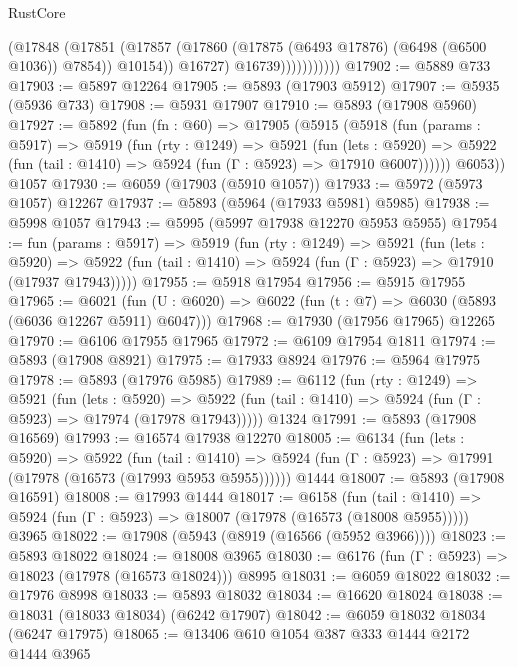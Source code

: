 \begin{lexlean}{RustCore}
\begin{coremodule}
                          (@17848
                            (@17851
                              (@17857
                                (@17860 (@17875 (@6493 @17876) (@6498 (@6500 @1036)) @7854))
                                @10154))
                            @16727)
                          @16739)))))))))))
@17902 := @5889 @733
@17903 := @5897 @12264
@17905 := @5893 (@17903 @5912)
@17907 := @5935 (@5936 @733)
@17908 := @5931 @17907
@17910 := @5893 (@17908 @5960)
@17927 := @5892
    (fun (fn : @60) =>
    @17905
      (@5915
        (@5918
          (fun (params : @5917) =>
          @5919
            (fun (rty : @1249) =>
            @5921
              (fun (lets : @5920) =>
              @5922 (fun (tail : @1410) => @5924 (fun (Γ : @5923) => @17910 @6007))))))
        @6053))
    @1057
@17930 := @6059 (@17903 (@5910 @1057))
@17933 := @5972 (@5973 @1057) @12267
@17937 := @5893 (@5964 (@17933 @5981) @5985)
@17938 := @5998 @1057
@17943 := @5995 (@5997 @17938 @12270 @5953 @5955)
@17954 := fun (params : @5917) =>
  @5919
    (fun (rty : @1249) =>
    @5921
      (fun (lets : @5920) =>
      @5922 (fun (tail : @1410) => @5924 (fun (Γ : @5923) => @17910 (@17937 @17943)))))
@17955 := @5918 @17954
@17956 := @5915 @17955
@17965 := @6021
    (fun (U : @6020) => @6022 (fun (t : @7) => @6030 (@5893 (@6036 @12267 @5911) @6047)))
@17968 := @17930 (@17956 @17965) @12265
@17970 := @6106 @17955 @17965
@17972 := @6109 @17954 @1811
@17974 := @5893 (@17908 @8921)
@17975 := @17933 @8924
@17976 := @5964 @17975
@17978 := @5893 (@17976 @5985)
@17989 := @6112
    (fun (rty : @1249) =>
    @5921
      (fun (lets : @5920) =>
      @5922 (fun (tail : @1410) => @5924 (fun (Γ : @5923) => @17974 (@17978 @17943)))))
    @1324
@17991 := @5893 (@17908 @16569)
@17993 := @16574 @17938 @12270
@18005 := @6134
    (fun (lets : @5920) =>
    @5922
      (fun (tail : @1410) =>
      @5924 (fun (Γ : @5923) => @17991 (@17978 (@16573 (@17993 @5953 @5955))))))
    @1444
@18007 := @5893 (@17908 @16591)
@18008 := @17993 @1444
@18017 := @6158
    (fun (tail : @1410) => @5924 (fun (Γ : @5923) => @18007 (@17978 (@16573 (@18008 @5955)))))
    @3965
@18022 := @17908 (@5943 (@8919 (@16566 (@5952 @3966))))
@18023 := @5893 @18022
@18024 := @18008 @3965
@18030 := @6176 (fun (Γ : @5923) => @18023 (@17978 (@16573 @18024))) @8995
@18031 := @6059 @18022
@18032 := @17976 @8998
@18033 := @5893 @18032
@18034 := @16620 @18024
@18038 := @18031 (@18033 @18034) (@6242 @17907)
@18042 := @6059 @18032 @18034 (@6247 @17975)
@18065 := @13406
    @610
    @1054
    @387
    @333
    @1444
    @2172
    @1444
    @3965

\end{coremodule}
\end{lexlean}

